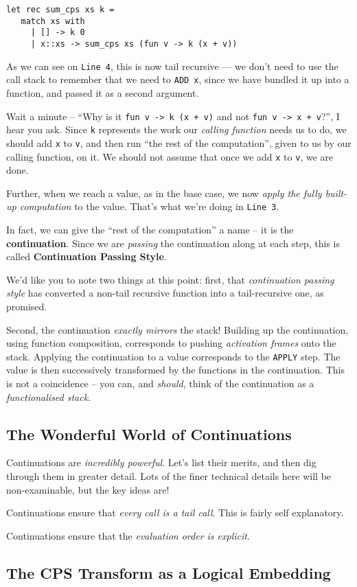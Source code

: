 \begin{code}
\label{code:sum-cps-ocaml}
\begin{verbatim}
let rec sum_cps xs k = 
   match xs with
     | [] -> k 0
     | x::xs -> sum_cps xs (fun v -> k (x + v))
\end{verbatim}
\end{code}

As we can see on \texttt{Line 4}, this is now tail recursive --- we don't need to use the call stack to remember that we need to \texttt{ADD x}, since we have bundled it up into a function, and passed it as a second argument. 

Wait a minute -- ``Why is it \texttt{fun v -> k (x + v)} and not \texttt{fun v -> x + v}?'', I hear you ask. Since \texttt{k} represents the work our \emph{calling function} needs us to do, we should add \texttt{x} to \texttt{v}, and then run ``the rest of the computation'', given to us by our calling function, on it. We should not assume that once we add \texttt{x} to \texttt{v}, we are done. 

Further, when we reach a value, as in the base case, we now \emph{apply the fully built-up computation} to the value. That's what we're doing in \texttt{Line 3}.

In fact, we can give the ``rest of the computation'' a name -- it is the \textbf{continuation}. Since we are \emph{passing} the continuation along at each step, this is called \textbf{Continuation Passing Style}.

We'd like you to note two things at this point: first, that \emph{continuation passing style} has converted a non-tail recursive function into a tail-recursive one, as promised. 

Second, the continuation \emph{exactly mirrors} the stack! Building up the continuation, using function composition, corresponds to pushing \emph{activation frames} onto the stack. Applying the continuation to a value corresponds to the \texttt{APPLY} step. The value is then successively transformed by the functions in the continuation. This is not a coincidence -- you can, and \emph{should}, think of the continuation as a \emph{functionalised stack}. 

\subsection{The Wonderful World of Continuations}
Continuations are \emph{incredibly powerful}. Let's list their merits, and then dig through them in greater detail. Lots of the finer technical details here will be non-examinable, but the key ideas are!

Continuations ensure that \emph{every call is a tail call}. This is fairly self explanatory.

Continuations ensure that the \emph{evaluation order is explicit}. 



\subsection{The CPS Transform as a Logical Embedding}